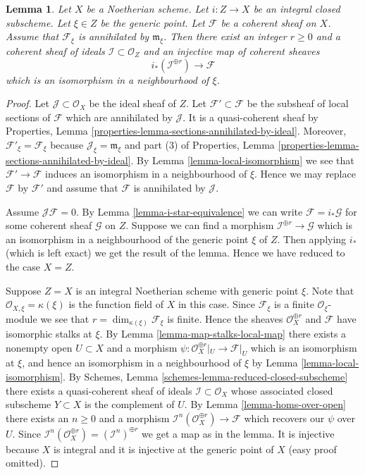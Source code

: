 \documentclass{stacks-project}
\theoremstyle{plain}
\newtheorem{lemma}[subsection]{Lemma}
\theoremstyle{definition}
\theoremstyle{remark}
\numberwithin{equation}{subsection}
\begin{document}
\begin{lemma}
\label{lemma-prepare-filter-irreducible}
Let $X$ be a Noetherian scheme.
Let $i : Z \to X$ be an integral closed subscheme.
Let $\xi \in Z$ be the generic point.
Let $\mathcal{F}$ be a coherent sheaf on $X$.
Assume that $\mathcal{F}_\xi$ is annihilated by
$\mathfrak m_\xi$. Then there exist an integer
$r \geq 0$ and a coherent sheaf of ideals $\mathcal{I} \subset \mathcal{O}_Z$
and an injective map of coherent sheaves
$$
i_*\left(\mathcal{I}^{\oplus r}\right) \to \mathcal{F}
$$
which is an isomorphism in a neighbourhood of $\xi$.
\end{lemma}

\begin{proof}
Let $\mathcal{J} \subset \mathcal{O}_X$ be the ideal sheaf of $Z$.
Let $\mathcal{F}' \subset \mathcal{F}$ be the subsheaf of
local sections of $\mathcal{F}$ which are annihilated by
$\mathcal{J}$. It is a quasi-coherent sheaf by
Properties, Lemma \ref{properties-lemma-sections-annihilated-by-ideal}.
Moreover, $\mathcal{F}'_\xi = \mathcal{F}_\xi$ because
$\mathcal{J}_\xi = \mathfrak m_\xi$ and part (3) of
Properties, Lemma \ref{properties-lemma-sections-annihilated-by-ideal}.
By Lemma \ref{lemma-local-isomorphism} we see that
$\mathcal{F}' \to \mathcal{F}$
induces an isomorphism in a neighbourhood of $\xi$.
Hence we may replace $\mathcal{F}$ by $\mathcal{F}'$ and assume
that $\mathcal{F}$ is annihilated by $\mathcal{J}$.

\medskip\noindent
Assume $\mathcal{J}\mathcal{F} = 0$. By
Lemma \ref{lemma-i-star-equivalence} we can write
$\mathcal{F} = i_*\mathcal{G}$ for some coherent
sheaf $\mathcal{G}$ on $Z$. Suppose we can find a morphism
$\mathcal{I}^{\oplus r} \to \mathcal{G}$ which is an isomorphism
in a neighbourhood of the generic point $\xi$ of $Z$.
Then applying $i_*$ (which is left exact) we get the result of the lemma.
Hence we have reduced to the case $X = Z$.

\medskip\noindent
Suppose $Z = X$ is an integral Noetherian scheme with generic point $\xi$.
Note that $\mathcal{O}_{X, \xi} = \kappa(\xi)$ is the function field of $X$
in this case.
Since $\mathcal{F}_\xi$ is a finite $\mathcal{O}_\xi$-module we see
that $r = \dim_{\kappa(\xi)} \mathcal{F}_\xi$ is finite.
Hence the sheaves $\mathcal{O}_X^{\oplus r}$ and $\mathcal{F}$
have isomorphic stalks at $\xi$.
By Lemma \ref{lemma-map-stalks-local-map} there exists a nonempty
open $U \subset X$ and a morphism
$\psi : \mathcal{O}_X^{\oplus r}|_U \to \mathcal{F}|_U$
which is an isomorphism
at $\xi$, and hence an isomorphism in a neighbourhood of $\xi$ by
Lemma \ref{lemma-local-isomorphism}.
By Schemes, Lemma \ref{schemes-lemma-reduced-closed-subscheme}
there exists a quasi-coherent sheaf of ideals
$\mathcal{I} \subset \mathcal{O}_X$
whose associated closed subscheme $Y \subset X$ is the complement
of $U$.
By Lemma \ref{lemma-homs-over-open} there exists an $n \geq 0$ and a morphism
$\mathcal{I}^n(\mathcal{O}_X^{\oplus r}) \to \mathcal{F}$
which recovers our $\psi$ over $U$. Since
$\mathcal{I}^n(\mathcal{O}_X^{\oplus r}) = (\mathcal{I}^n)^{\oplus r}$
we get a map as in the lemma. It is injective because $X$ is
integral and it is injective at the generic point of $X$
(easy proof omitted).
\end{proof}
\end{document}
